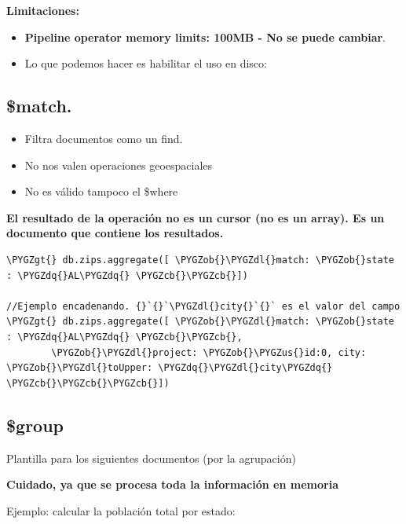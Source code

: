 \documentclass[a4paper,10pt,english]{sphinxmanual}
\def\PYGZus{\char`\_}
\def\PYGZob{\char`\{}
\def\PYGZcb{\char`\}}
\def\PYGZgt{\char`\>}
\def\PYGZdl{\char`\$}
\def\PYGZdq{\char`\"}
\begin{document}
\textbf{Limitaciones:}
\begin{itemize}
\item {} 
\textbf{Pipeline operator memory limits: 100MB - No se puede cambiar}.

\item {} 
Lo que podemos hacer es habilitar el uso en disco: 

\end{itemize}


\subsection{\$match.}
\label{contents/aggregationFramework:match}\begin{itemize}
\item {} 
Filtra documentos como un find.

\item {} 
No nos valen operaciones geoespaciales

\item {} 
No es válido tampoco el \$where

\end{itemize}

\textbf{El resultado de la operación no es un cursor (no es un array). Es un documento que contiene los resultados.}

\begin{Verbatim}[commandchars=\\\{\}]
\PYGZgt{} db.zips.aggregate([ \PYGZob{}\PYGZdl{}match: \PYGZob{}state : \PYGZdq{}AL\PYGZdq{} \PYGZcb{}\PYGZcb{}])

//Ejemplo encadenando. {}`{}`\PYGZdl{}city{}`{}` es el valor del campo
\PYGZgt{} db.zips.aggregate([ \PYGZob{}\PYGZdl{}match: \PYGZob{}state : \PYGZdq{}AL\PYGZdq{} \PYGZcb{}\PYGZcb{},
        \PYGZob{}\PYGZdl{}project: \PYGZob{}\PYGZus{}id:0, city: \PYGZob{}\PYGZdl{}toUpper: \PYGZdq{}\PYGZdl{}city\PYGZdq{} \PYGZcb{}\PYGZcb{}\PYGZcb{}])
\end{Verbatim}


\subsection{\$group}
\label{contents/aggregationFramework:group}
Plantilla para los siguientes documentos (por la agrupación)

\textbf{Cuidado, ya que se procesa toda la información en memoria}

Ejemplo: calcular la población total por estado:
\end{document}
